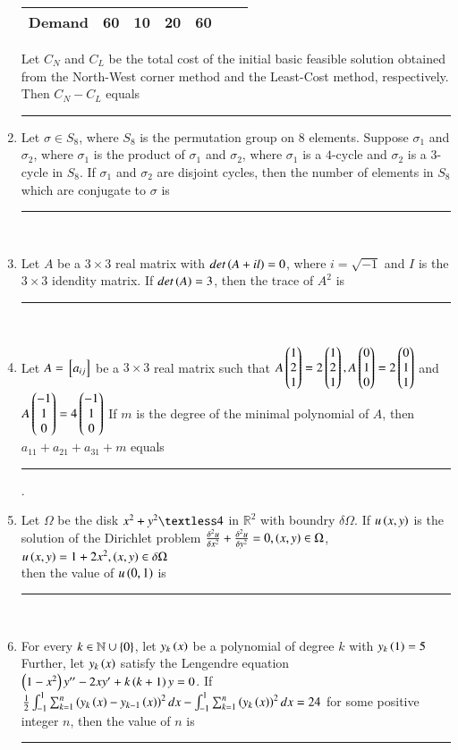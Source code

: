 \documentclass[journal]{IEEEtran}
\begin{document}
\begin{enumerate}
{\begin{table}[H]
\begin{tabular}{|c|c|c|c|c|c|c|}
        \textbf{Demand} & 60 & 10 & 20 & 60 & \\ \hline
    \end{tabular}
\end{table} 
Let $C_N$ and $C_L$ be the total cost of the initial basic feasible solution obtained from the North-West corner method and the Least-Cost method, respectively. Then $C_N-C_L$ equals \rule{2cm}{0.15mm}
}
\item{
Let $\sigma\in S_8$, where $S_8$ is the permutation group on $8$ elements. Suppose $\sigma_1$ and $\sigma_2$, where $\sigma_1$ is the product of $\sigma_1$ and $\sigma_2$, where $\sigma_1$ is a $4$-cycle and $\sigma_2$ is a $3$-cycle in $S_8$. If $\sigma_1$ and $\sigma_2$ are disjoint cycles, then the number of elements in $S_8$ which are conjugate to $\sigma$ is \rule{2cm}{0.15mm}\\
}
\item{
Let $A$ be a $3\times 3$ real matrix with $det\left(A+il\right)=0$, where $i=\sqrt{-1}$ and $I$ is the $3\times 3$ idendity matrix. If $det\left(A\right)=3$, then the trace of $A^2$ is\rule{2cm}{0.15mm}\\
}
\item{
Let $A={}\left[a_{ij}\right]$ be a $3\times 3$ real matrix such that $A\begin{pmatrix}1\\2\\1\end{pmatrix}=2\begin{pmatrix}1\\2\\1\end{pmatrix},A\begin{pmatrix}0\\1\\0\end{pmatrix}=2\begin{pmatrix}0\\1\\1\end{pmatrix}$ and $A\begin{pmatrix}-1\\1\\0\end{pmatrix}=4\begin{pmatrix}-1\\1\\0\end{pmatrix}$ If $m$ is the degree of the minimal polynomial of $A$, then $a_{11}+a_{21}+a_{31}+m$ equals\rule{2cm}{0.15mm}.\\
}
\item{
Let $\Omega$ be the disk $x^2+y^2\textless 4$ in $\mathbb{R}^2$ with boundry $\delta\Omega$. If $u\left(x,y\right)$ is the solution of the Dirichlet problem $\frac{\delta^2u}{\delta x^2}+\frac{\delta^2u}{\delta y^2}=0,\left(x,y\right)\in\Omega$,\\$u\left(x,y\right)=1+2x^2,\left(x,y\right)\in\delta\Omega$ \\then the value of $u\left(0,1\right)$ is \rule{2cm}{0.15mm}\\ 
}
\item{
For every $k\in\mathbb{N}\cup\left\{0\right\}$, let $y_k\left(x\right)$ be a polynomial of degree $k$ with $y_k\left(1\right)=5$ Further, let $y_k\left(x\right)$ satisfy the Lengendre equation $\left(1-x^2\right)y^{\prime\prime}-2xy^{\prime}+k\left(k+1\right)y=0$. If $\frac{1}{2}\int_{-1}^1\sum_{k=1}^n\left(y_k\left(x\right)-y_{k-1}\left(x\right)\right)^2dx-\int_{-1}^1\sum_{k=1}^n\left(y_k\left(x\right)\right)^2dx=24$ for some positive integer $n$, then the value of $n$ is \rule{2cm}{0.15mm}\\
}
\end{enumerate}
\end{document}

